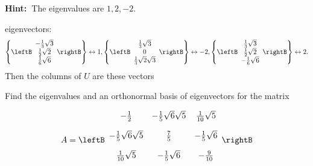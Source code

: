 \begin{enumialphparenastyle}
\begin{ex}
\textbf{Hint:\ }The eigenvalues are $1,2,-2.$
\begin{sol}
eigenvectors:
\[
\left\{ \leftB
\begin{array}{c}
-\frac{1}{3}\sqrt{3} \\
\frac{1}{2}\sqrt{2} \\
\frac{1}{6}\sqrt{6}
\end{array}
\rightB \right\} \leftrightarrow 1,\left\{ \leftB
\begin{array}{c}
\frac{1}{3}\sqrt{3} \\
0 \\
\frac{1}{3}\sqrt{2}\sqrt{3}
\end{array}
\rightB \right\} \leftrightarrow -2,\allowbreak \left\{ \leftB
\begin{array}{c}
\frac{1}{3}\sqrt{3} \\
\frac{1}{2}\sqrt{2} \\
-\frac{1}{6}\sqrt{6}
\end{array}
\rightB \right\} \leftrightarrow 2.
\]
Then the columns of $U$ are these vectors
\end{sol}
\end{ex}

\begin{ex} Find the eigenvalues and an orthonormal basis of eigenvectors for the
matrix

\begin{equation*}
A = \leftB 
\begin{array}{ccc}
-\vspace{0.05in}\frac{1}{2} & -\vspace{0.05in}\frac{1}{5}\sqrt{6}\sqrt{5} & 
\vspace{0.05in}\frac{1}{10}\sqrt{5} \\ 
-\vspace{0.05in}\frac{1}{5}\sqrt{6}\sqrt{5} & \vspace{0.05in}\frac{7}{5} & -
\vspace{0.05in}\frac{1}{5}\sqrt{6} \\ 
\vspace{0.05in}\frac{1}{10}\sqrt{5} & -\vspace{0.05in}\frac{1}{5}\sqrt{6} & -
\vspace{0.05in}\frac{9}{10}
\end{array}
\rightB
\end{equation*}


\end{ex}
\end{enumialphparenastyle}
